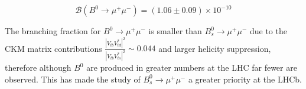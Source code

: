 $$ \mathcal{B}(B^{0} \to \mu^{+} \mu^{-}) = (1.06\pm0.09)\times 10^{-10}$$


The branching fraction  for $B^{0} \to \mu^{+} \mu^{-}$ is smaller than $B_{s}^{0} \to \mu^{+} \mu^{-}$ due to the CKM matrix contributions $\frac{|V_{tb}V_{td}^{*}|^{2}}{|V_{tb}V_{ts}^{*}|^{2}} \sim 0.044$ and larger helicity suppression, therefore although $B^{0}$ are produced in greater numbers at the LHC far fewer are observed. This has made the study of $B_{s}^{0} \to \mu^{+} \mu^{-}$ a greater priority at the LHCb.










